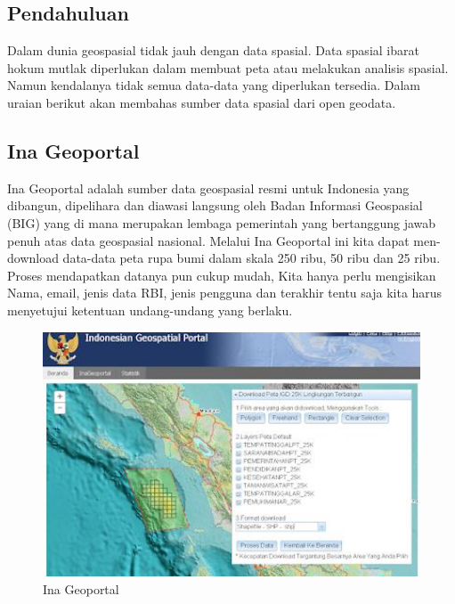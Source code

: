 \subsection{Pendahuluan}
Dalam dunia geospasial tidak jauh dengan data spasial. Data spasial ibarat hokum mutlak diperlukan dalam membuat peta atau melakukan analisis spasial. Namun kendalanya tidak semua data-data yang diperlukan tersedia. Dalam uraian berikut akan membahas sumber data spasial dari open geodata.

\subsection{Ina Geoportal}
Ina Geoportal adalah sumber data geospasial resmi untuk Indonesia yang  dibangun, dipelihara dan diawasi langsung oleh Badan Informasi Geospasial (BIG) yang di mana merupakan lembaga pemerintah yang bertanggung jawab penuh atas data geospasial nasional. Melalui Ina Geoportal ini kita dapat men-download data-data peta rupa bumi dalam skala 250 ribu, 50 ribu dan 25 ribu. Proses mendapatkan datanya pun cukup mudah, Kita hanya perlu mengisikan Nama, email, jenis data RBI, jenis pengguna dan terakhir tentu saja kita harus menyetujui ketentuan undang-undang yang berlaku. 
\begin{figure}[htbp]
\centering
\includegraphics[width=1\textwidth]{pictures/ina_geospasial}
\caption{Ina Geoportal}
\label{labelgambar1}
\end{figure}

